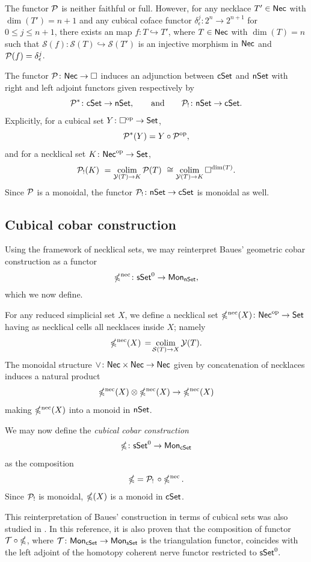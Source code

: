 \begin{remark*}
	The functor $\mathcal{P}$ is neither faithful or full.
	However, for any necklace $T' \in \mathsf{Nec}$ with $\dim(T')=n+1$ and any cubical coface functor $\delta_{\epsilon}^j \colon 2^n \to 2^{n+1}$ for $0 \leq j \leq n+1$, there exists an map $f \colon T \hookrightarrow T'$, where $T \in \mathsf{Nec}$ with $\dim(T)=n$ such that $\mathcal{S}(f) \colon \mathcal{S}(T) \hookrightarrow \mathcal{S}(T')$ is an injective morphism in $\mathsf{Nec}$ and $\mathcal{P}(f) = \delta_{\epsilon}^j$.
\end{remark*}

The functor $\mathcal{P} \colon \mathsf{Nec} \to \square$ induces an adjunction between $\mathsf{cSet}$ and $\mathsf{nSet}$ with right and left adjoint functors given respectively by
\[
\mathcal{P}^\ast \colon \mathsf{cSet} \to \mathsf{nSet},
\qquad \text{and} \qquad
\mathcal{P}_{!} \colon \mathsf{nSet} \to \mathsf{cSet}.
\]
Explicitly, for a cubical set $Y \colon \square^{\mathrm{op}} \to \mathsf{Set}$,
\[
\mathcal{P}^\ast(Y)= Y \circ \mathcal{P}^{\mathrm{op}},
\]
and for a necklical set $K \colon \mathsf{Nec}^{\mathrm{op}} \to \mathsf{Set}$,
\[
\mathcal{P}_{!}(K) \ =
\operatorname*{colim}_{\mathcal{Y}(T) \to K} \mathcal{P}(T) \ \cong
\operatorname*{colim}_{\mathcal{Y}(T) \to K} \square^{\dim(T)}.
\]
Since $\mathcal{P}$ is a monoidal, the functor $\mathcal{P}_{!} \colon \mathsf{nSet} \to \mathsf{cSet}$ is monoidal as well.

\subsection{Cubical cobar construction}\label{ss:cubical cobar}

Using the framework of necklical sets, we may reinterpret Baues' geometric cobar construction \cite{baues1980geometry} as a functor
\[
\operatorname{\mathbb{\Omega}^{\mathrm{nec}}} \colon \mathsf{sSet}^0 \to \mathsf{Mon}_{\mathsf{nSet}},
\]
which we now define.

For any reduced simplicial set $X$, we define a necklical set $\operatorname{\mathbb{\Omega}^{\mathrm{nec}}}(X) \colon \mathsf{Nec}^{\mathrm{op}} \to \mathsf{Set}$ having as necklical cells all necklaces inside $X$; namely
\[
\operatorname{\mathbb{\Omega}^{\mathrm{nec}}}(X) \, = \! \operatorname*{colim}_{\mathcal{S}(T) \to X} \mathcal{Y}(T).
\]
The monoidal structure $\vee \colon \mathsf{Nec} \times \mathsf{Nec} \to \mathsf{Nec}$ given by concatenation of necklaces induces a natural product
\[
\operatorname{\mathbb{\Omega}^{\mathrm{nec}}}(X) \otimes \operatorname{\mathbb{\Omega}^{\mathrm{nec}}}(X) \to \operatorname{\mathbb{\Omega}^{\mathrm{nec}}}(X)
\]
making $\operatorname{\mathbb{\Omega}^{\mathrm{nec}}}(X)$ into a monoid in $\mathsf{nSet}$.

We may now define the \textit{cubical cobar construction}
\[
\operatorname{\mathbb{\Omega}} \colon \mathsf{sSet}^0 \to \mathsf{Mon}_{\mathsf{cSet}}
\]
as the composition
\[
\operatorname{\mathbb{\Omega}} = \mathcal{P}_! \, \circ \operatorname{\mathbb{\Omega}^{\mathrm{nec}}}.
\]
Since $\mathcal{P}_!$ is monoidal, $\operatorname{\mathbb{\Omega}}(X)$ is a monoid in $\mathsf{cSet}$.

\begin{remark}
	This reinterpretation of Baues' construction in terms of cubical sets was also studied in \cite{rivera2018cubical}.
	In this reference, it is also proven that the composition of functor $\mathcal{T} \circ \operatorname{\mathbb{\Omega}}$, where $\mathcal{T} \colon \mathsf{Mon}_{\mathsf{cSet}} \to \mathsf{Mon}_{\mathsf{sSet}}$ is the triangulation functor, coincides with the left adjoint of the homotopy coherent nerve functor restricted to $\mathsf{sSet}^0.$
\end{remark}

